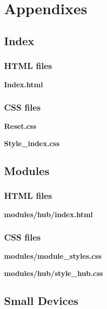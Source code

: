\newpage
\chapter{Appendixes}

\section{Index}

\subsection{HTML files}

\noindent \textbf{Index.html}


\subsection{CSS files}

\noindent \textbf{Reset.css}


\noindent \textbf{Style\_index.css}



\section{Modules}

\subsection{HTML files}

\noindent \textbf{modules/hub/index.html}


\subsection{CSS files}

\noindent \textbf{modules/module\_styles.css}



\noindent \textbf{modules/hub/style\_hub.css}



\section{Small Devices}

